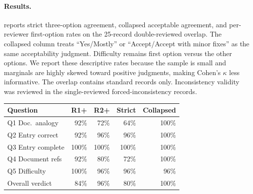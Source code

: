 \paragraph{Results.}
 reports strict three-option agreement, collapsed acceptable agreement, and per-reviewer first-option rates on the 25-record double-reviewed overlap. The collapsed column treats ``Yes/Mostly'' or ``Accept/Accept with minor fixes'' as the same acceptability judgment. Difficulty remains first option versus the other options. We report these descriptive rates because the sample is small and marginals are highly skewed toward positive judgments, making Cohen's $\kappa$ less informative. The overlap contains standard records only. Inconsistency validity was reviewed in the single-reviewed forced-inconsistency records.

\begin{center}
\small
\setlength{\tabcolsep}{3pt}
\begin{tabular}{lrrrr}
\toprule
Question & R1+ & R2+ & Strict & Collapsed \\
\midrule
Q1 Doc.\ analogy   & 92\%  & 72\%  & 64\%  & 100\% \\
Q2 Entry correct   & 92\%  & 96\%  & 96\%  & 100\% \\
Q3 Entry complete  & 100\% & 100\% & 100\% & 100\% \\
Q4 Document refs & 92\%  & 80\%  & 72\%  & 100\% \\
Q5 Difficulty      & 100\% & 96\%  & 96\%  & 96\% \\
Overall verdict    & 84\%  & 96\%  & 80\%  & 100\% \\
\bottomrule
\end{tabular}
\label{tab:iaa}
\end{center}

